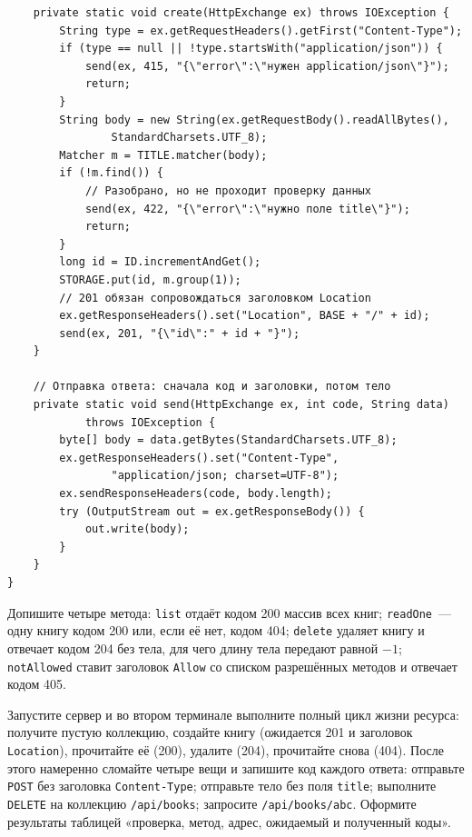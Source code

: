 \begin{listing}[H]
\begin{verbatim}
    private static void create(HttpExchange ex) throws IOException {
        String type = ex.getRequestHeaders().getFirst("Content-Type");
        if (type == null || !type.startsWith("application/json")) {
            send(ex, 415, "{\"error\":\"нужен application/json\"}");
            return;
        }
        String body = new String(ex.getRequestBody().readAllBytes(),
                StandardCharsets.UTF_8);
        Matcher m = TITLE.matcher(body);
        if (!m.find()) {
            // Разобрано, но не проходит проверку данных
            send(ex, 422, "{\"error\":\"нужно поле title\"}");
            return;
        }
        long id = ID.incrementAndGet();
        STORAGE.put(id, m.group(1));
        // 201 обязан сопровождаться заголовком Location
        ex.getResponseHeaders().set("Location", BASE + "/" + id);
        send(ex, 201, "{\"id\":" + id + "}");
    }

    // Отправка ответа: сначала код и заголовки, потом тело
    private static void send(HttpExchange ex, int code, String data)
            throws IOException {
        byte[] body = data.getBytes(StandardCharsets.UTF_8);
        ex.getResponseHeaders().set("Content-Type",
                "application/json; charset=UTF-8");
        ex.sendResponseHeaders(code, body.length);
        try (OutputStream out = ex.getResponseBody()) {
            out.write(body);
        }
    }
}
\end{verbatim}
\caption{Каркас REST-сервиса «Библиотека»}
\label{lst:08-8}
\end{listing}

Допишите четыре метода: \texttt{list} отдаёт кодом 200 массив всех книг;
\texttt{readOne}~--- одну книгу кодом 200 или, если её нет, кодом 404;
\texttt{delete} удаляет книгу и отвечает кодом 204 без тела, для чего длину тела
передают равной $-1$; \texttt{notAllowed} ставит заголовок \texttt{Allow} со
списком разрешённых методов и отвечает кодом 405.

Запустите сервер и во втором терминале выполните полный цикл жизни ресурса:
получите пустую коллекцию, создайте книгу (ожидается 201 и заголовок
\texttt{Location}), прочитайте её (200), удалите (204), прочитайте снова (404).
После этого намеренно сломайте четыре вещи и запишите код каждого ответа:
отправьте \texttt{POST} без заголовка \texttt{Content-Type}; отправьте тело без
поля \texttt{title}; выполните \texttt{DELETE} на коллекцию
\texttt{/api/books}; запросите \texttt{/api/books/abc}. Оформите результаты
таблицей «проверка, метод, адрес, ожидаемый и полученный коды».

